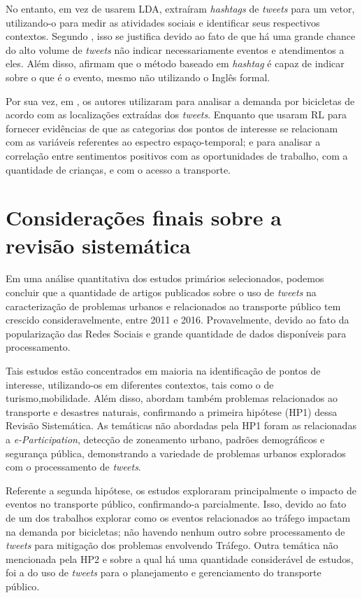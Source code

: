 \documentclass[
	12pt,				%
	oneside,			%
	a4paper,			%
	english,			%
	brazil				%
	]{abntex2ppgsi}
\begin{document}
No entanto, \cite{Ni2016} em vez de usarem LDA, extraíram \textit{hashtags} de \textit{tweets} para um vetor, utilizando-o para medir as atividades sociais e identificar seus respectivos contextos. Segundo \cite{Ni2016}, isso se justifica devido ao fato de que há uma grande chance do alto volume de \textit{tweets} não indicar necessariamente eventos e atendimentos a eles. Além disso, afirmam que o método baseado em \textit{hashtag} é capaz de indicar sobre o que é o evento, mesmo não utilizando o Inglês formal.

Por sua vez, em \cite{Gutev2016}, os autores utilizaram  para analisar a demanda por bicicletas de acordo com as localizações extraídas dos \textit{tweets}. Enquanto que \cite{Bendler2014} usaram RL para fornecer evidências de que as categorias dos pontos de interesse se relacionam com as variáveis referentes ao espectro espaço-temporal; e \cite{Guo2016} para analisar a correlação entre sentimentos positivos com as oportunidades de trabalho, com a quantidade de crianças, e com o acesso a transporte. 

\section{Considerações finais sobre a revisão sistemática}
\label{conclusao}
Em uma análise quantitativa dos estudos primários selecionados, podemos concluir que a quantidade de artigos publicados sobre o uso de \textit{tweets} na caracterização de problemas urbanos e relacionados ao transporte público tem crescido consideravelmente, entre 2011 e 2016. Provavelmente, devido ao fato da popularização das Redes Sociais e grande quantidade de dados disponíveis para processamento.

Tais estudos estão concentrados em maioria na identificação de pontos de interesse, utilizando-os em diferentes contextos, tais como o de turismo,mobilidade. Além disso, abordam também problemas relacionados ao transporte e desastres naturais, confirmando a primeira hipótese (HP1) dessa Revisão Sistemática. As temáticas não abordadas pela HP1 foram as relacionadas a \textit{e-Participation}, detecção de zoneamento urbano, padrões demográficos e segurança pública, demonstrando a variedade de problemas urbanos explorados com o processamento de \textit{tweets}.

Referente a segunda hipótese, os estudos exploraram principalmente o impacto de eventos no transporte público, confirmando-a parcialmente. Isso, devido ao fato de um dos trabalhos explorar como os eventos relacionados ao tráfego impactam na demanda por bicicletas; não havendo nenhum outro sobre processamento de \textit{tweets} para mitigação dos problemas envolvendo Tráfego. Outra temática não mencionada pela HP2 e sobre a qual há uma quantidade considerável de estudos, foi a do uso de \textit{tweets} para o planejamento e gerenciamento do transporte público.
\end{document}
